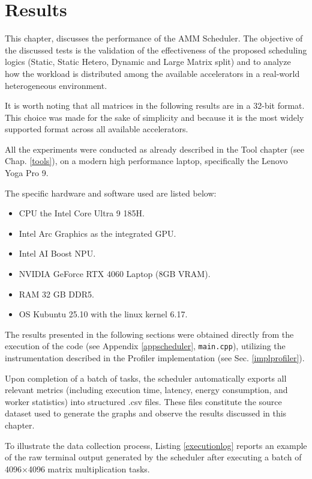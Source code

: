 \chapter{Results}
\label{results}

This chapter, discusses the performance of the AMM Scheduler. The objective of the discussed tests is the validation of the effectiveness of the proposed scheduling logics (Static, Static Hetero, Dynamic and Large Matrix split) and to analyze how the workload is distributed among the available accelerators in a real-world heterogeneous environment.

It is worth noting that all matrices in the following results are in a 32-bit format. This choice was made for the sake of simplicity and because it is the most widely supported format across all available accelerators.

All the experiments were conducted as already described in the Tool chapter (see Chap. \ref{tools}), on a modern high performance laptop, specifically the Lenovo Yoga Pro 9. 

The specific hardware and software used are listed below:
\begin{itemize} 
    \item CPU the Intel Core Ultra 9 185H.
    \item Intel Arc Graphics as the integrated GPU.
    \item Intel AI Boost NPU. 
    \item NVIDIA GeForce RTX 4060 Laptop (8GB VRAM). 
    \item RAM 32 GB DDR5. 
    \item OS Kubuntu 25.10 with the linux kernel 6.17. 
\end{itemize}

The results presented in the following sections were obtained directly from the execution of the code (see Appendix \ref{appscheduler}, \texttt{main.cpp}), utilizing the instrumentation described in the Profiler implementation (see Sec. \ref{implprofiler}).

Upon completion of a batch of tasks, the scheduler automatically exports all relevant metrics (including execution time, latency, energy consumption, and worker statistics) into structured .csv files. These files constitute the source dataset used to generate the graphs and observe the results discussed in this chapter.

To illustrate the data collection process, Listing \ref{executionlog} reports an example of the raw terminal output generated by the scheduler after executing a batch of 4096×4096 matrix multiplication tasks. 

